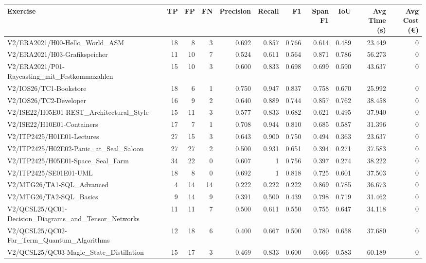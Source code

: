 \begin{tabular}{lrrrrrrrrrr}
Exercise & TP & FP & FN & Precision & Recall & F1 & Span F1 & IoU & Avg Time (s) & Avg Cost (€) \\
\hline
V2/ERA2021/H00-Hello\_World\_ASM & 18 & 8 & 3 & 0.692 & 0.857 & 0.766 & 0.614 & 0.489 & 23.449 & 0 \\
V2/ERA2021/H03-Grafikspeicher & 11 & 10 & 7 & 0.524 & 0.611 & 0.564 & 0.871 & 0.786 & 56.273 & 0 \\
V2/ERA2021/P01-Raycasting\_mit\_Festkommazahlen & 15 & 10 & 3 & 0.600 & 0.833 & 0.698 & 0.699 & 0.590 & 43.637 & 0 \\
V2/IOS26/TC1-Bookstore & 18 & 6 & 1 & 0.750 & 0.947 & 0.837 & 0.758 & 0.670 & 25.992 & 0 \\
V2/IOS26/TC2-Developer & 16 & 9 & 2 & 0.640 & 0.889 & 0.744 & 0.857 & 0.762 & 38.458 & 0 \\
V2/ISE22/H05E01-REST\_Architectural\_Style & 15 & 11 & 3 & 0.577 & 0.833 & 0.682 & 0.621 & 0.495 & 37.940 & 0 \\
V2/ISE22/H10E01-Containers & 17 & 7 & 1 & 0.708 & 0.944 & 0.810 & 0.685 & 0.587 & 31.396 & 0 \\
V2/ITP2425/H01E01-Lectures & 27 & 15 & 3 & 0.643 & 0.900 & 0.750 & 0.494 & 0.363 & 23.637 & 0 \\
V2/ITP2425/H02E02-Panic\_at\_Seal\_Saloon & 27 & 27 & 2 & 0.500 & 0.931 & 0.651 & 0.394 & 0.271 & 37.583 & 0 \\
V2/ITP2425/H05E01-Space\_Seal\_Farm & 34 & 22 & 0 & 0.607 & 1 & 0.756 & 0.397 & 0.274 & 38.222 & 0 \\
V2/ITP2425/SE01E01-UML & 18 & 8 & 0 & 0.692 & 1 & 0.818 & 0.725 & 0.601 & 37.503 & 0 \\
V2/MTG26/TA1-SQL\_Advanced & 4 & 14 & 14 & 0.222 & 0.222 & 0.222 & 0.869 & 0.785 & 36.673 & 0 \\
V2/MTG26/TA2-SQL\_Basics & 9 & 14 & 9 & 0.391 & 0.500 & 0.439 & 0.798 & 0.719 & 31.462 & 0 \\
V2/QCSL25/QC01-Decision\_Diagrams\_and\_Tensor\_Networks & 11 & 11 & 7 & 0.500 & 0.611 & 0.550 & 0.755 & 0.647 & 34.118 & 0 \\
V2/QCSL25/QC02-Far\_Term\_Quantum\_Algorithms & 12 & 18 & 6 & 0.400 & 0.667 & 0.500 & 0.780 & 0.658 & 37.680 & 0 \\
V2/QCSL25/QC03-Magic\_State\_Distillation & 15 & 17 & 3 & 0.469 & 0.833 & 0.600 & 0.666 & 0.583 & 60.189 & 0 \\
\end{tabular}

